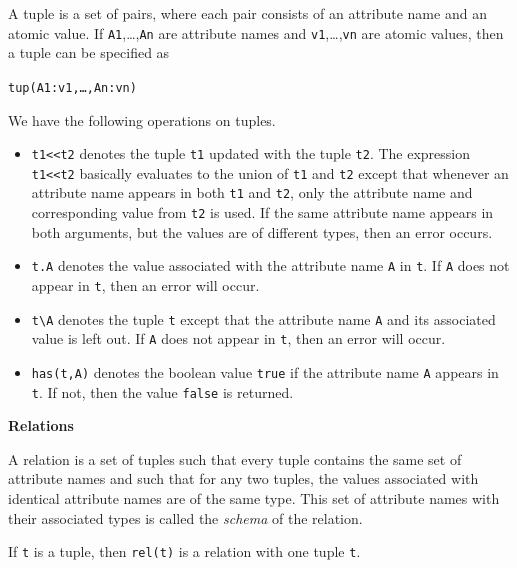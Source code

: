 \documentclass[a4,14pt,latin1]{article}
\begin{document}
A tuple is a set of pairs, where each pair consists of an attribute name
and an atomic value. If {\tt A1},\ldots,{\tt An} are attribute names and
{\tt v1},\ldots,{\tt vn} are atomic values, then a tuple can be specified as
\begin{center}
{\tt tup(A1:v1,\ldots,An:vn)}
\end{center}
We have the following operations on tuples.
\begin{itemize}
\item
{\tt t1<<t2} denotes the tuple {\tt t1} updated with the tuple {\tt t2}.
The expression {\tt t1<<t2} basically evaluates to the union of
{\tt t1} and {\tt t2} except that whenever an attribute name appears in
both {\tt t1} and {\tt t2}, only the attribute name and corresponding value
from {\tt t2} is used.
If the same attribute name appears in both arguments, but the values are
of different types, then an error occurs.
\item
{\tt t.A} denotes the value associated with the attribute name {\tt A} in
{\tt t}. If {\tt A} does not appear in {\tt t}, then an error will occur.
\item
{\tt t\verb"\"A} denotes the tuple {\tt t}
except that the attribute name {\tt A}
and its associated value is left out.
If {\tt A} does not appear in {\tt t}, then an error will occur.
\item
{\tt has(t,A)} denotes the boolean value {\tt true} if the attribute name
{\tt A} appears in {\tt t}. If not, then the value {\tt false} is returned.
\end{itemize}

\vspace{2ex}
{\bf Relations}

A relation is a set of tuples such that every tuple contains the same set of
attribute names and such that for any two tuples, the values associated with
identical attribute names are of the same type. This set of attribute names
with their associated types is called the {\em schema\/} of the relation.

If {\tt t} is a tuple, then {\tt rel(t)} is a relation with one tuple {\tt t}.
\end{document}
